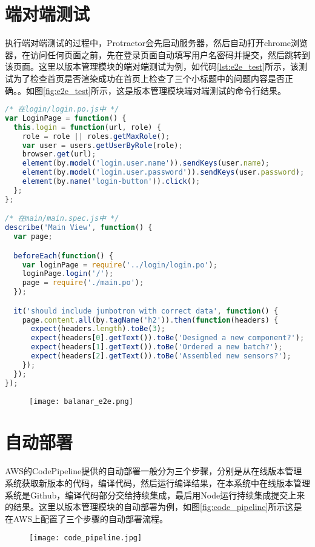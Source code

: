 \section{端对端测试}
执行端对端测试的过程中，Protractor会先启动服务器，然后自动打开chrome浏览器，在访问任何页面之前，先在登录页面自动填写用户名密码并提交，然后跳转到该页面。这里以版本管理模块的端对端测试为例，如代码\ref{lst:e2e_test}所示，该测试为了检查首页是否渲染成功在首页上检查了三个小标题中的问题内容是否正确。。如图\ref{fig:e2e_test}所示，这是版本管理模块端对端测试的命令行结果。
\begin{lstlisting}[language={JavaScript}, label={lst:e2e_test}, caption={端对端测试样例代码}]
/* 在login/login.po.js中 */
var LoginPage = function() {
  this.login = function(url, role) {
    role = role || roles.getMaxRole();
    var user = users.getUserByRole(role);
    browser.get(url);
    element(by.model('login.user.name')).sendKeys(user.name);
    element(by.model('login.user.password')).sendKeys(user.password);
    element(by.name('login-button')).click();
  };
};

/* 在main/main.spec.js中 */
describe('Main View', function() {
  var page;

  beforeEach(function() {
    var loginPage = require('../login/login.po');
    loginPage.login('/');
    page = require('./main.po');
  });

  it('should include jumbotron with correct data', function() {
    page.content.all(by.tagName('h2')).then(function(headers) {
      expect(headers.length).toBe(3);
      expect(headers[0].getText()).toBe('Designed a new component?');
      expect(headers[1].getText()).toBe('Ordered a new batch?');
      expect(headers[2].getText()).toBe('Assembled new sensors?');
    });
  });
});
\end{lstlisting}

\begin{figure}[!htp]
 \centering
 \texttt{[image: balanar\_e2e.png]}
\end{figure}

\section{自动部署}
AWS的CodePipeline提供的自动部署一般分为三个步骤，分别是从在线版本管理系统获取新版本的代码，编译代码，然后运行编译结果，在本系统中在线版本管理系统是Github，编译代码部分交给持续集成，最后用Node运行持续集成提交上来的结果。这里以版本管理模块的自动部署为例，如图\ref{fig:code_pipeline}所示这是在AWS上配置了三个步骤的自动部署流程。
\begin{figure}[H]
 \centering
 \texttt{[image: code\_pipeline.jpg]}
\end{figure}

